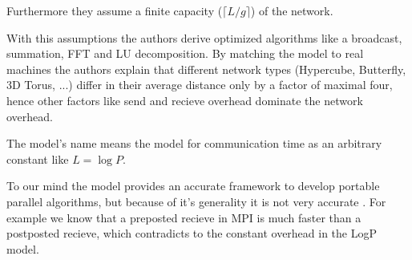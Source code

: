 \documentclass[oneside, a4paper, DIV=10]{scrartcl}
\begin{document}
\begin{itemize}
    Furthermore they assume a finite capacity ($\lceil L/g \rceil$) of the
    network.

    With this assumptions the authors derive optimized algorithms like a
    broadcast, summation, FFT and LU decomposition. By matching the
    model to real machines the authors explain that different network
    types (Hypercube, Butterfly, 3D Torus, ...) differ in their average
    distance only by a factor of maximal four, hence other factors like
    send and recieve overhead dominate the network overhead.

    The model's name means the model for communication time as an arbitrary
    constant like $L = \log P$.

    To our mind the model provides an accurate framework to develop portable
    parallel algorithms, but because of it's generality it is not very accurate
    . For example we know that a preposted recieve in MPI is much faster
    than a postposted recieve, which contradicts to the constant overhead
    in the LogP model.
\end{itemize}
\end{document}
